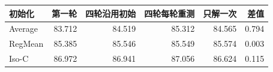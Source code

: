 \begin{tabular}{lrrrrr}
\toprule
初始化 & 第一轮 & 四轮沿用初始 & 四轮每轮重测 & 只解一次 & 差值 \\
\midrule
Average & 83.712 & 84.519 & 85.312 & 84.565 & 0.794 \\
RegMean & 85.385 & 85.546 & 85.549 & 85.574 & 0.003 \\
Iso-C & 86.972 & 86.941 & 87.056 & 86.624 & 0.115 \\
\bottomrule
\end{tabular}
